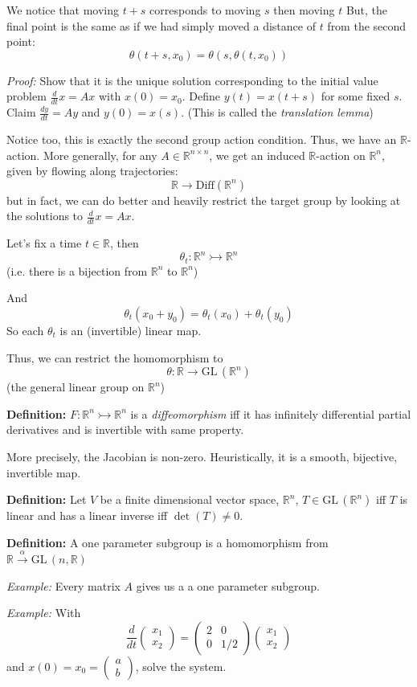 \documentclass[12pt]{article}
\newcommand{\R}{\mathbb{R}}
\newcommand{\GL}{\text{GL}\,}
\begin{document}
    We notice that moving $t + s$ corresponds to moving $s$ then moving $t$ But, the final point is the same as if we had simply moved a distance of $t$ from the second point: 
    \[\theta(t + s, x_0) = \theta(s, \theta(t, x_0))\]
 
    \emph{Proof:} Show that it is the unique solution corresponding to the initial value problem $\frac{d}{dt}x = Ax$ with $x(0) = x_0$. Define $y(t) = x(t + s)$ for some fixed $s$. Claim $\frac{dy}{dt} = Ay$ and $y(0) = x(s)$. (This is called the \emph{translation lemma})

    Notice too, this is exactly the second group action condition. Thus, we have an $\R$-action. More generally, for any $A \in \R^{n\times n}$, we get an induced $\R$-action on $\R^n$, given by flowing along trajectories:
    \[\R \to \text{Diff}(\R^n)\]
    but in fact, we can do better and heavily restrict the target group by looking at the solutions to $\frac{d}{dt}x = Ax$. 

    Let's fix a time $t \in \R$, then 
    \[\theta_t: \R^n \rightarrowtail \R^n\]
    (i.e. there is a bijection from $\R^n$ to $\R^n$)

    And 
    \[\theta_t(x_0 + y_0) = \theta_t(x_0) + \theta_t(y_0)\] 
    So each $\theta_t$ is an (invertible) linear map. 

    Thus, we can restrict the homomorphism to 
    \[\theta: \R \to \GL(\R^n)\] 
    (the general linear group on $\R^n$) 

    \textbf{Definition:} $F: \R^n \rightarrowtail \R^n$ is a \emph{diffeomorphism} iff it has infinitely differential partial derivatives and is invertible with same property. 

    More precisely, the Jacobian is non-zero. Heuristically, it is a smooth, bijective, invertible map. 

    \textbf{Definition:} Let $V$ be a finite dimensional vector space, $\R^n$, $T \in \GL(\R^n)$ iff $T$ is linear and has a linear inverse iff $\det(T) \neq 0$.  

    \textbf{Definition:} A one parameter subgroup is a homomorphism from $\R \overset{\alpha}{\longrightarrow} \GL(n, \R)$ 
    
    \emph{Example:} Every matrix $A$ gives us a a one parameter subgroup.

    \emph{Example:} With
    \[\frac{d}{dt}\begin{pmatrix}
        x_1\\x_2
    \end{pmatrix} = \begin{pmatrix}
        2 & 0\\ 
        0 & 1/2
    \end{pmatrix} \begin{pmatrix}
        x_1\\ x_2
    \end{pmatrix}\]
    and $x(0) = x_0 = \begin{pmatrix}
        a\\b
    \end{pmatrix}$, solve the system. 
    
\end{document}
